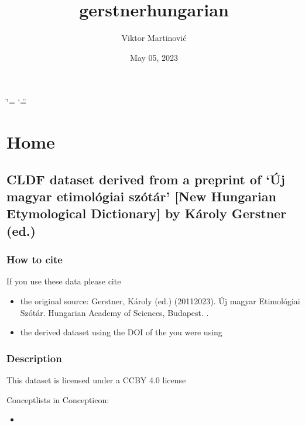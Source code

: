 \documentclass[letterpaper,10pt,english]{sphinxmanual}
\title{gerstnerhungarian}
\date{May 05, 2023}
\author{Viktor Martinović}
\begin{document}
\ifdefined\shorthandoff
  \ifnum\catcode`\=\string=\active\shorthandoff{=}\fi
  \ifnum\catcode`\"=\active{}\fi
\fi

\pagestyle{empty}
\sphinxmaketitle
\pagestyle{plain}
\sphinxtableofcontents
\pagestyle{normal}
\label{\detokenize{index::doc}}


\sphinxstepscope


\chapter{Home}
\label{\detokenize{home:home}}\label{\detokenize{home::doc}}

\section{CLDF dataset derived from a preprint of ‘Új magyar etimológiai szótár’ {[}New Hungarian Etymological Dictionary{]} by Károly Gerstner (ed.)}
\label{\detokenize{home:cldf-dataset-derived-from-a-preprint-of-uj-magyar-etimologiai-szotar-new-hungarian-etymological-dictionary-by-karoly-gerstner-ed}}

\subsection{How to cite}
\label{\detokenize{home:how-to-cite}}
\sphinxAtStartPar
If you use these data please cite
\begin{itemize}
\item {} 
\sphinxAtStartPar
the original source: Gerstner, Károly (ed.) (2011\sphinxhyphen{}2023).
Új magyar Etimológiai Szótár.
Hungarian Academy of Sciences, Budapest. .

\item {} 
\sphinxAtStartPar
the derived dataset using the DOI of the 
you were using

\end{itemize}


\subsection{Description}
\label{\detokenize{home:description}}
\sphinxAtStartPar
This dataset is licensed under a CC\sphinxhyphen{}BY 4.0 license

\sphinxAtStartPar
Conceptlists in Concepticon:
\begin{itemize}
\item {} 
\sphinxAtStartPar
{}

\end{itemize}
\end{document}
